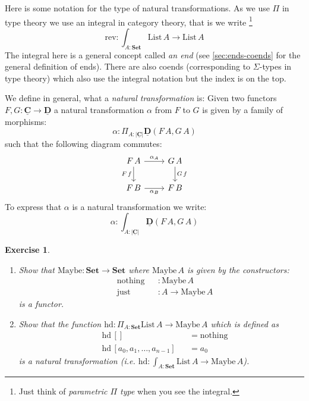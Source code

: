 \documentclass{article}
\newcommand{\Set}{\mathbf{Set}}
\newcommand{\cat}[1]{\underline{\mathbf{#1}}}
\newcommand{\obj}[1]{|#1|}
\newcommand{\List}{\mathrm{List}}
\newcommand{\rev}{\mathrm{rev}}
\newcommand{\Maybe}{\mathrm{Maybe}}
\newcommand{\nothing}{\mathrm{nothing}}
\newcommand{\just}{\mathrm{just}}
\newcommand{\hd}{\mathrm{hd}}
\newtheorem{exercise}{Exercise}
\begin{document}
Here is some notation for the type of natural transformations. As we use $\Pi$ in type theory we use an integral in category theory, that is we write
\footnote{Just think of \emph{parametric $\Pi$ type} when you see the integral.}
\[ \rev : \int_{A:\Set} \List\,A \to \List\,A \]
The integral here is a general concept called \emph{an end} (see \autoref{sec:ends-coends} for the general definition of ends). There are also coends (corresponding to $\Sigma$-types in type theory) which also use the integral notation but the index is on the top.

We define in general, what a \emph{natural transformation} is: Given two functors $F,G : \cat{C} \to \cat{D}$ a natural transformation $\alpha$ from $F$ to $G$ is given by a family of morphisms: 
\[\alpha : \Pi_{A : \obj{\cat{C}}} \cat{D}(F\,A,G\,A)\]
such that the following diagram commutes:
\[\begin{tikzcd}
F\,A \arrow[r,"\alpha_A"] \arrow[d,"F\,f" left] & G\,A \arrow[d,"G\,f"]\\
F\,B \arrow[r,"\alpha_B" below] & F\,B
\end{tikzcd}
\]
To express that $\alpha$ is a natural transformation we write:
\[ \alpha : \int_{A : \obj{\cat{C}}} \cat{D}(F\,A,G\,A)\]

\begin{exercise}\hfill

  \begin{enumerate}
  \item 
    Show that $\Maybe : \Set \to \Set$ where $\Maybe\,A$ is given by the constructors:
    \begin{align*}
      &\nothing && : \Maybe\,A \\
      &\just && : A \to \Maybe\,A
    \end{align*}
   is a functor.
  \item Show that the function $\hd : \Pi_{A:\Set}\List\,A \to \Maybe\,A$ which is defined as
    \begin{align*}
      &\hd\,[] && = \nothing \\
      &\hd\,  [a_0,a_1,\dots,a_{n-1}]  && = a_0
    \end{align*}
    is a natural transformation (i.e. $\hd : \int_{A:\Set}\List\,A \to \Maybe\,A$).
  \end{enumerate}
\end{exercise}
\end{document}
